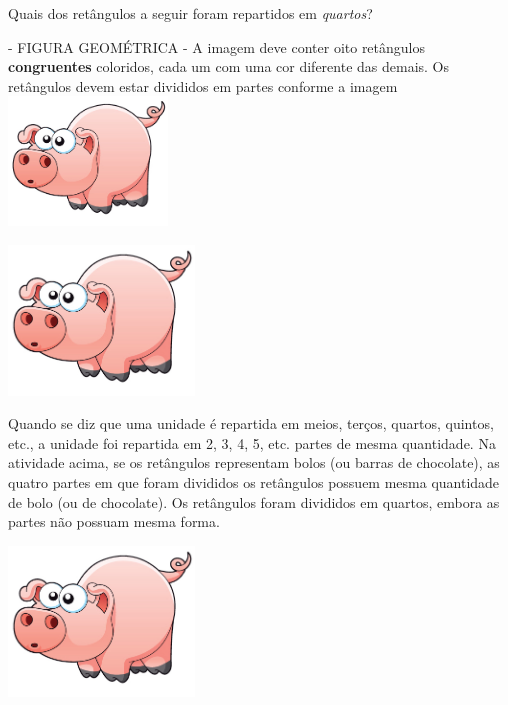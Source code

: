 \documentclass[a4,12pt]{book}
\newcounter{atividade}
\begin{document}
Quais dos retângulos a seguir foram repartidos em {\it quartos}?

\begin{imagem*}[breakable]{}{}   - FIGURA GEOMÉTRICA - A imagem deve conter oito retângulos   {\bf congruentes}   coloridos, cada um com uma cor diferente das demais. Os retângulos devem estar divididos em partes conforme a imagem
    \includegraphics[width=120pt, keepaspectratio]{pig}

\end{imagem*}










\includegraphics[width=\textwidth,height=4cm, keepaspectratio]{pig}



\begin{refletindo*}
  Quando se diz que uma unidade é repartida em meios, terços, quartos, quintos, etc., a unidade foi repartida em 2, 3, 4, 5, etc. partes de mesma quantidade.
  Na atividade acima, se os retângulos representam bolos (ou barras de chocolate), as quatro partes em que foram divididos os retângulos possuem mesma quantidade de bolo (ou de chocolate).
  Os retângulos foram divididos em quartos, embora as partes não possuam mesma forma.
\end{refletindo*}


\includegraphics[width=\textwidth,height=4cm, keepaspectratio]{pig}
\end{document}
